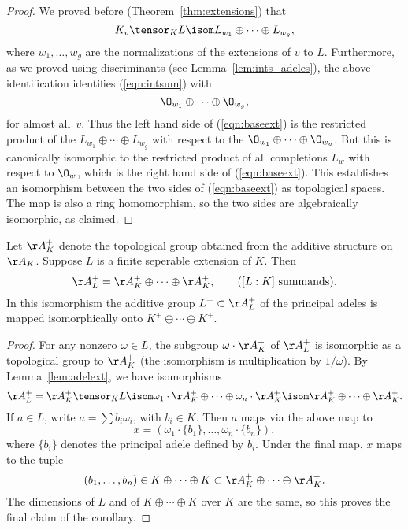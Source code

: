 \documentclass[11pt]{book}
\begin{document}
\begin{ch}
\begin{proof}
We proved before (Theorem~\ref{thm:extensions}) that
 $$
  K_v \tensor_K L \isom L_{w_1} \oplus \cdots \oplus L_{w_g},
  $$
  where $w_1,\ldots, w_g$ are the normalizations of the extensions
  of $v$ to $L$.  Furthermore, as we proved using discriminants (see
  Lemma~\ref{lem:ints_adeles}), the above identification identifies
  (\ref{eqn:intsum}) with
$$
 \O_{w_1} \oplus \cdots \oplus \O_{w_g},
$$
for almost all~$v$.
Thus the left hand side of (\ref{eqn:baseext}) is the restricted
product of the $L_{w_1} \oplus \cdots \oplus L_{w_g}$
with respect to the $\O_{w_1} \oplus \cdots \oplus \O_{w_g}$.
But this is canonically isomorphic to the restricted product
of all completions $L_w$ with respect to $\O_w$, which
is the right hand side of (\ref{eqn:baseext}).  This
establishes an isomorphism between the two sides of (\ref{eqn:baseext})
as topological spaces.  The map is also a ring homomorphism, so
the two sides are algebraically isomorphic, as claimed.
\end{proof}

\begin{corollary}\label{cor:addstruct}
Let $\AA_K^+$ denote the topological group obtained from the
additive structure on $\AA_K$.  Suppose $L$ is a finite seperable
extension of $K$.
 Then
$$
  \AA_L^+ = \AA_K^+ \oplus \cdots \oplus \AA_K^+,
\qquad ([L:K] \text{ summands}).
$$
In this isomorphism the additive group $L^+\subset \AA_L^+$ of the
principal adeles is mapped isomorphically onto $K^+\oplus \cdots
\oplus K^+$.
\end{corollary}
\begin{proof}
For any nonzero $\omega \in L$, the subgroup $\omega\cdot \AA_K^+$
of $\AA_L^+$ is isomorphic as a topological group to $\AA_K^+$
(the isomorphism is multiplication by $1/\omega$).  By
Lemma~\ref{lem:adelext}, we have isomorphisms
$$
\AA_L^+ = \AA_K^+ \tensor_K L
   \isom \omega_1\cdot \AA_K^+ \oplus \cdots \oplus \omega_n \cdot \AA_K^+
   \isom \AA_K^+ \oplus \cdots \oplus \AA_K^+.
$$
If $a \in L$, write $a=\sum b_i \omega_i$, with $b_i \in K$.
Then $a$ maps via the above map to
$$x = (\omega_1\cdot \{b_1\},\ldots, \omega_n \cdot \{b_n\}),$$
where $\{b_i\}$ denotes the principal adele defined by $b_i$.
Under the final map, $x$ maps to the tuple
$$(b_1,\ldots, b_n) \in K\oplus \cdots \oplus K \subset
\AA_K^+ \oplus \cdots \oplus \AA_K^+.$$
The dimensions of $L$ and of $K\oplus \cdots \oplus K$ over
$K$ are the same, so
this proves the final claim of the corollary.
\end{proof}


\end{ch}
\end{document}
